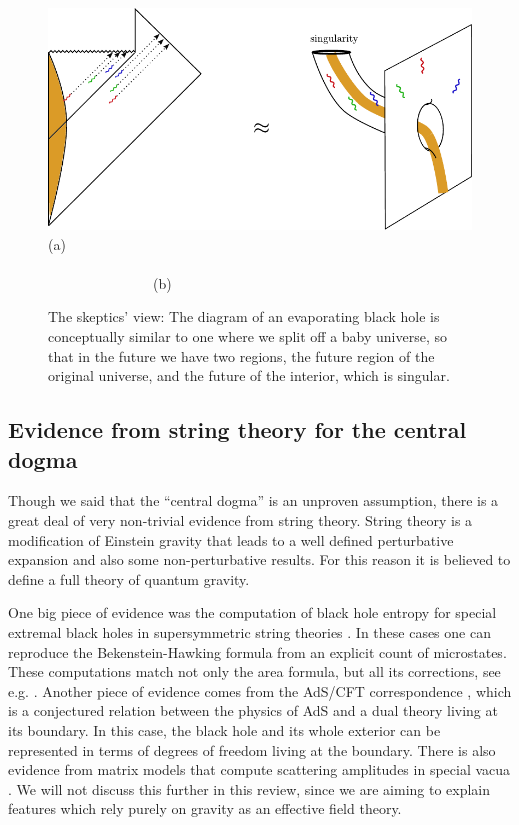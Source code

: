 \begin{figure}[h]
\begin{center}
\includegraphics[scale=1]{figures/baby-universe.pdf} \\
(a) ~~~~~~~~~~~~~~~~~~~~~~~~~~~~~~~~~~~~~~~~~~~~~~~~~~~~~~~~~~~~~~~~~~~~~~~~~~~(b)
\caption{\small The skeptics' view: The diagram of an evaporating black hole is conceptually similar to one where we split off a baby universe, so that in the future we have two regions, the future region of the original universe, and the future of the interior, which is singular.}
\label{BabyUniverse}
\end{center}
\end{figure}


\subsection{Evidence from string theory for the central dogma} 

 
Though we said that the ``central dogma'' is an unproven assumption, there is a great deal of very non-trivial evidence from string theory. 
String theory is a modification of Einstein gravity that leads to a well defined perturbative expansion and also some non-perturbative results. For this reason it is believed to define a full theory of quantum gravity. 

One big piece of evidence was the computation of black hole entropy for special extremal black holes in supersymmetric string theories \cite{Strominger:1996sh}. In these cases one can reproduce the 
 Bekenstein-Hawking   formula from an explicit count of microstates.  These computations match not only the area formula, but all its corrections, see e.g. \cite{Dabholkar:2014ema}. Another piece of evidence comes from the AdS/CFT correspondence \cite{Maldacena:1997re,Witten:1998qj,Gubser:1998bc}, which is a conjectured relation between the physics of AdS and a dual theory living at its boundary.  In this case, the black hole and its whole exterior can be represented in terms of degrees of freedom living at the boundary. There is also evidence from matrix models that compute scattering amplitudes  in special vacua \cite{Banks:1996vh}.  We will not discuss this further  in this review, since we are aiming to explain features which rely purely on gravity as an effective field theory. 

